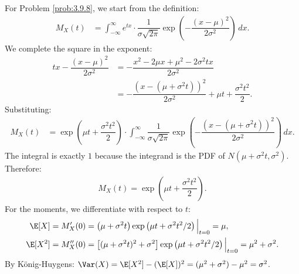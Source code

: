 \begin{solucion}
	\label{sol:3.9.8}
	For Problem \ref{prob:3.9.8}, we start from the definition:
	\begin{align*}
		M_{X}(t) &= \int_{-\infty}^{\infty} e^{tx} \cdot \dfrac{1}{\sigma\sqrt{2\pi}} \exp\left(-\dfrac{(x-\mu)^{2}}{2\sigma^{2}}\right)\,dx.
		\end{align*}
		We complete the square in the exponent:
		\begin{align*}
			tx - \dfrac{(x-\mu)^{2}}{2\sigma^{2}} &= -\dfrac{x^{2} - 2\mu x + \mu^{2} - 2\sigma^{2}tx}{2\sigma^{2}} \\
			&= -\dfrac{(x - (\mu + \sigma^{2}t))^{2}}{2\sigma^{2}} + \mu t + \dfrac{\sigma^{2}t^{2}}{2}.
		\end{align*}
		Substituting:
		\begin{align*}
			M_{X}(t) &= \exp\left(\mu t + \dfrac{\sigma^{2}t^{2}}{2}\right) \cdot \int_{-\infty}^{\infty} \dfrac{1}{\sigma\sqrt{2\pi}} \exp\left(-\dfrac{(x - (\mu + \sigma^{2}t))^{2}}{2\sigma^{2}}\right)\,dx.
		\end{align*}
		The integral is exactly $1$ because the integrand is the PDF of $N(\mu + \sigma^{2}t, \sigma^{2})$. Therefore:
		\begin{align*}
			M_{X}(t) = \exp\left(\mu t + \dfrac{\sigma^{2}t^{2}}{2}\right).
		\end{align*}
		For the moments, we differentiate with respect to $t$:
		\begin{align*}
			\E[X] &= M_{X}'(0) = \left(\mu + \sigma^{2}t\right) \exp\left(\mu t + \sigma^{2}t^{2}/2\right)\Big|_{t=0} = \mu, \\
			\E[X^{2}] &= M_{X}''(0) = \left[(\mu + \sigma^{2}t)^{2} + \sigma^{2}\right] \exp\left(\mu t + \sigma^{2}t^{2}/2\right)\Big|_{t=0} = \mu^{2} + \sigma^{2}.
		\end{align*}
		By König-Huygens: $\Var(X) = \E[X^{2}] - (\E[X])^{2} = (\mu^{2} + \sigma^{2}) - \mu^{2} = \sigma^{2}$. \qedhere
\end{solucion}

